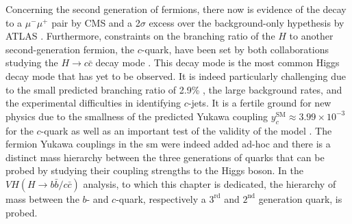 Concerning the second generation of fermions, there now is evidence of the decay to a $\mu^-\mu^+$ pair by CMS \cite{CMS:2020xwi} and a 2$\sigma$ excess over the background-only hypethesis by ATLAS \cite{ATLAS:2020fzp}. Furthermore, constraints on the branching ratio of the $H$ to another second-generation fermion, the $c$-quark, have been set by both collaborations studying the $H \rightarrow c\bar{c}$ decay mode \cite{Aaboud:2018fhh}. This decay mode is the most common Higgs decay mode that has yet to be observed. It is indeed particularly challenging due to the small predicted branching ratio of 2.9\% \cite{DJOUADI199856}, the large background rates, and the experimental difficulties in identifying $c$-jets. It is a fertile ground for new physics  due to the smallness of the predicted Yukawa coupling $y^{\textrm{SM}}_c \approx 3.99 \times 10^{-3} $ \cite{yukawac} for the $c$-quark as well as an important test of the validity of the model \cite{PhysRevD.89.033014, PhysRevD.92.033016, Botella:2016krk, PhysRevD.98.055001, GHOSH2016504, PhysRevLett.123.031802, PhysRevD.100.115041}. The fermion Yukawa couplings in the \gls{sm} were indeed added ad-hoc and there is a distinct mass hierarchy between the three generations of quarks that can be probed by studying their coupling strengths to the Higgs boson. In the $VH (H \rightarrow b\bar{b}/c\bar{c})$ analysis, to which this chapter is dedicated, the hierarchy of mass between the $b$- and $c$-quark, respectively a $3^{\textrm{rd}}$ and $2^{\textrm{nd}}$ generation quark, is probed.

